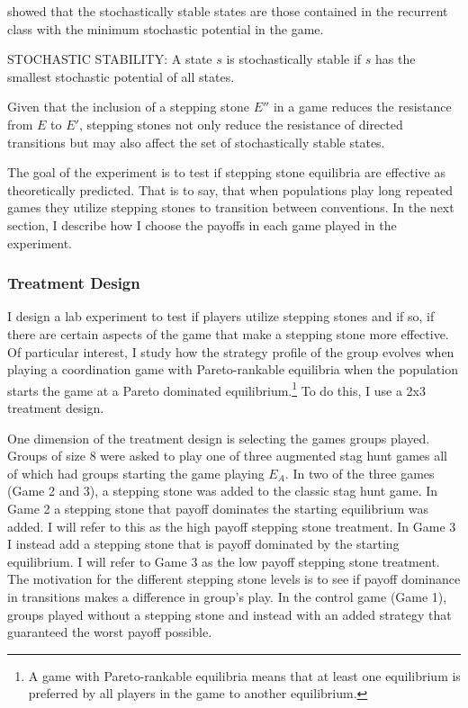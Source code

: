 \cite{young1993evolution} showed that the stochastically stable states are those contained in the recurrent class with the minimum stochastic potential in the game. 

\begin{definition}
    STOCHASTIC STABILITY: A state $s$ is stochastically stable if $s$ has the smallest stochastic potential of all states.
\end{definition}

Given that the inclusion of a stepping stone $E''$ in a game reduces the resistance from $E$ to $E'$, stepping stones not only reduce the resistance of directed transitions but may also affect the set of stochastically stable states.

The goal of the experiment is to test if stepping stone equilibria are effective as theoretically predicted. That is to say, that when populations play long repeated games they utilize stepping stones to transition between conventions. In the next section, I describe how I choose the payoffs in each game played in the experiment. 

\subsubsection{Treatment Design}

I design a lab experiment to test if players utilize stepping stones and if so, if there are certain aspects of the game that make a stepping stone more effective. Of particular interest, I study how the strategy profile of the group evolves when playing a coordination game with Pareto-rankable equilibria when the population starts the game at a Pareto dominated equilibrium.\footnote{A game with Pareto-rankable equilibria means that at least one equilibrium is preferred by all players in the game to another equilibrium.} To do this, I use a 2x3 treatment design. 

One dimension of the treatment design is selecting the games groups played. Groups of size 8 were asked to play one of three augmented stag hunt games all of which had groups starting the game playing $E_A$. In two of the three games (Game 2 and 3), a stepping stone was added to the classic stag hunt game. In Game 2 a stepping stone that payoff dominates the starting equilibrium was added. I will refer to this as the high payoff stepping stone treatment. In Game 3 I instead add a stepping stone that is payoff dominated by the starting equilibrium. I will refer to Game 3 as the low payoff stepping stone treatment. The motivation for the different stepping stone levels is to see if payoff dominance in transitions makes a difference in group’s play. In the control game (Game 1), groups played without a stepping stone and instead with an added strategy that guaranteed the worst payoff possible.

